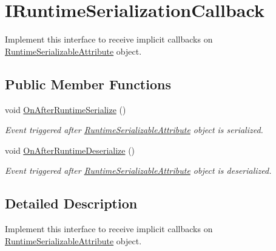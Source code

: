 \hypertarget{interface_voxel_busters_1_1_runtime_serialization_1_1_i_runtime_serialization_callback}{}\section{I\+Runtime\+Serialization\+Callback}
\label{interface_voxel_busters_1_1_runtime_serialization_1_1_i_runtime_serialization_callback}


Implement this interface to receive implicit callbacks on \hyperlink{class_voxel_busters_1_1_runtime_serialization_1_1_runtime_serializable_attribute}{Runtime\+Serializable\+Attribute} object.  


\subsection*{Public Member Functions}
\begin{DoxyCompactItemize}
\item 
void \hyperlink{interface_voxel_busters_1_1_runtime_serialization_1_1_i_runtime_serialization_callback_aac1895404ac627f90f5c2da1e0168430}{On\+After\+Runtime\+Serialize} ()
\begin{DoxyCompactList}\small\item\em Event triggered after \hyperlink{class_voxel_busters_1_1_runtime_serialization_1_1_runtime_serializable_attribute}{Runtime\+Serializable\+Attribute} object is serialized. \end{DoxyCompactList}\item 
void \hyperlink{interface_voxel_busters_1_1_runtime_serialization_1_1_i_runtime_serialization_callback_ae69d517ef3e44fb508e804a576a0ad36}{On\+After\+Runtime\+Deserialize} ()
\begin{DoxyCompactList}\small\item\em Event triggered after \hyperlink{class_voxel_busters_1_1_runtime_serialization_1_1_runtime_serializable_attribute}{Runtime\+Serializable\+Attribute} object is deserialized. \end{DoxyCompactList}\end{DoxyCompactItemize}


\subsection{Detailed Description}
Implement this interface to receive implicit callbacks on \hyperlink{class_voxel_busters_1_1_runtime_serialization_1_1_runtime_serializable_attribute}{Runtime\+Serializable\+Attribute} object. 



